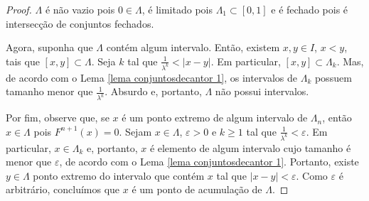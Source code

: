 \begin{proof}
$\Lambda$ é não vazio pois $0 \in \Lambda$, é limitado pois $\Lambda_1 \subset [0, 1]$ e é fechado pois é intersecção de conjuntos fechados.

Agora, suponha que $\Lambda$ contém algum intervalo. Então, existem $x, y \in I$, $x < y$, tais que $[x, y] \subset \Lambda$. Seja $k$ tal que $\frac{1}{\lambda^k} < |x - y|$. Em particular, $[x, y] \subset \Lambda_k$. Mas, de acordo com o Lema \ref{lema conjuntosdecantor 1}, os intervalos de $\Lambda_k$ possuem tamanho menor que $\frac{1}{\lambda^k}$. Absurdo e, portanto, $\Lambda$ não possui intervalos.

Por fim, observe que, se $x$ é um ponto extremo de algum intervalo de $\Lambda_n$, então $x \in \Lambda$ pois $F^{n+1}(x) = 0$. Sejam $x \in \Lambda$, $\varepsilon > 0$ e $k \geq 1$ tal que $\frac{1}{\lambda^k} < \varepsilon$. Em particular, $x \in \Lambda_k$ e, portanto, $x$ é elemento de algum intervalo cujo tamanho é menor que $\varepsilon$, de acordo com o Lema \ref{lema conjuntosdecantor 1}. Portanto, existe $y \in \Lambda$ ponto extremo do intervalo que contém $x$ tal que $|x - y| < \varepsilon$. Como $\varepsilon$ é arbitrário, concluímos que $x$ é um ponto de acumulação de $\Lambda$.
\end{proof}
